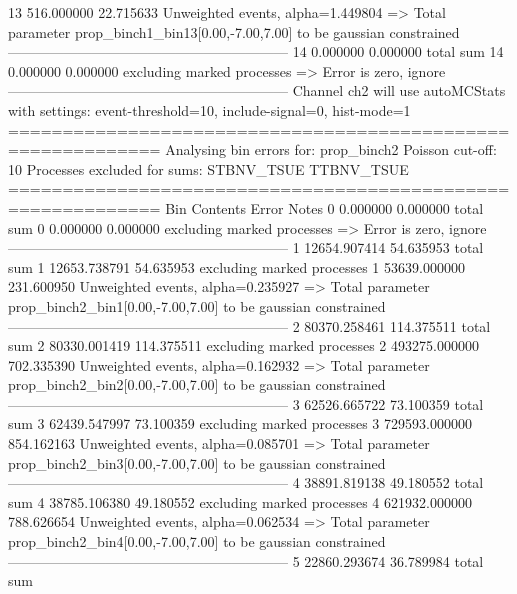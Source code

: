 13         516.000000      22.715633       Unweighted events, alpha=1.449804
  => Total parameter prop_binch1_bin13[0.00,-7.00,7.00] to be gaussian constrained
------------------------------------------------------------
14         0.000000        0.000000        total sum                     
14         0.000000        0.000000        excluding marked processes    
  => Error is zero, ignore      
------------------------------------------------------------
Channel ch2 will use autoMCStats with settings: event-threshold=10, include-signal=0, hist-mode=1
============================================================
Analysing bin errors for: prop_binch2
Poisson cut-off: 10
Processes excluded for sums: STBNV_TSUE TTBNV_TSUE
============================================================
Bin        Contents        Error           Notes                         
0          0.000000        0.000000        total sum                     
0          0.000000        0.000000        excluding marked processes    
  => Error is zero, ignore      
------------------------------------------------------------
1          12654.907414    54.635953       total sum                     
1          12653.738791    54.635953       excluding marked processes    
1          53639.000000    231.600950      Unweighted events, alpha=0.235927
  => Total parameter prop_binch2_bin1[0.00,-7.00,7.00] to be gaussian constrained
------------------------------------------------------------
2          80370.258461    114.375511      total sum                     
2          80330.001419    114.375511      excluding marked processes    
2          493275.000000   702.335390      Unweighted events, alpha=0.162932
  => Total parameter prop_binch2_bin2[0.00,-7.00,7.00] to be gaussian constrained
------------------------------------------------------------
3          62526.665722    73.100359       total sum                     
3          62439.547997    73.100359       excluding marked processes    
3          729593.000000   854.162163      Unweighted events, alpha=0.085701
  => Total parameter prop_binch2_bin3[0.00,-7.00,7.00] to be gaussian constrained
------------------------------------------------------------
4          38891.819138    49.180552       total sum                     
4          38785.106380    49.180552       excluding marked processes    
4          621932.000000   788.626654      Unweighted events, alpha=0.062534
  => Total parameter prop_binch2_bin4[0.00,-7.00,7.00] to be gaussian constrained
------------------------------------------------------------
5          22860.293674    36.789984       total sum                     
